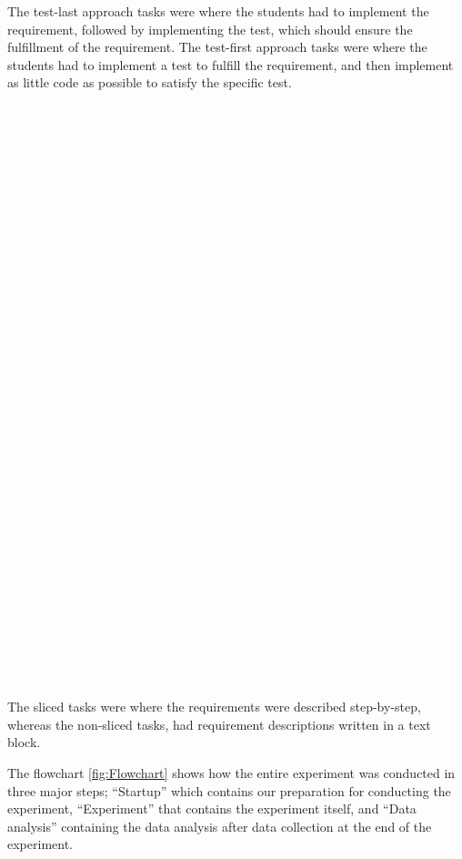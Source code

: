 \documentclass{sig-alternate-05-2015}
\begin{document}
The test-last approach tasks were where the students had to implement the requirement, followed by implementing the test, which should ensure the fulfillment of the requirement.
The test-first approach tasks were where the students had to implement a test to fulfill the requirement, and then implement as little code as possible to satisfy the specific test.\\\\\\\\\\\\\\\\\\\\\\\\\\\\\\\\\\\\\\\\\\\\\\\\\\\\\\\\\\\\\\\\\\\\\\
The sliced tasks were where the requirements were described step-by-step, whereas the non-sliced tasks, had requirement descriptions written in a text block.

The flowchart \ref{fig:Flowchart} shows how the entire experiment was conducted in three major steps; ``Startup'' which contains our preparation for conducting the experiment, ``Experiment'' that contains the experiment itself, and ``Data analysis'' containing the data analysis after data collection at the end of the experiment.
\end{document}
